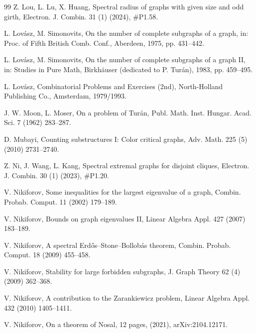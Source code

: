 \documentclass[11pt]{article}
\begin{document}
\begin{thebibliography}{99}
Z. Lou, L. Lu, X. Huang, 
Spectral radius of graphs with given size and odd girth, 
Electron. J. Combin. 31 (1) (2024), \#P1.58. 

L. Lov\'{a}sz, M. Simonovits,
On the number of complete subgraphs of a graph,
in: Proc. of Fifth British Comb. Conf., Aberdeen, 1975,
pp. 431--442.

L. Lov\'{a}sz, M. Simonovits,
On the number of complete subgraphs of a graph II,
in: Studies in Pure Math, Birkh\"{a}user (dedicated to P. Tur\'{a}n), 1983,
pp. 459--495. 

L. Lov\'{a}sz, 
Combinatorial Problems and Exercises (2nd), 
North-Holland Publishing Co., Amsterdam, 1979/1993. 


J. W. Moon, L. Moser, 
On a problem of Tur\'{a}n, 
Publ. Math. Inst. Hungar. Acad. Sci. 7 (1962) 283--287.

 D. Mubayi, 
 Counting substructures I: Color critical graphs, 
 Adv. Math. 225 (5) (2010) 2731--2740. 

Z. Ni, J. Wang, L. Kang, Spectral extremal graphs for disjoint cliques, Electron. J. Combin. 30 (1) (2023), \#P1.20. 

V. Nikiforov, 
Some inequalities for the largest eigenvalue of a graph, 
Combin. Probab. Comput. 11 (2002) 179--189. 

V. Nikiforov, Bounds on graph eigenvalues II,
Linear Algebra Appl. 427 (2007) 183--189.


V. Nikiforov, 
A spectral Erd\H{o}s--Stone--Bollob\'{a}s theorem, 
Combin. Probab.  Comput. 18 (2009) 455--458.  

V. Nikiforov, 
Stability for large forbidden subgraphs,  
J. Graph Theory 62 (4) (2009) 362--368.   

V. Nikiforov, A contribution to the Zarankiewicz problem, 
Linear Algebra Appl. 432 (2010) 1405--1411. 


 V. Nikiforov,  On a theorem of Nosal, 12 pages, 
 (2021), arXiv:2104.12171. 


\end{thebibliography}
\end{document}
